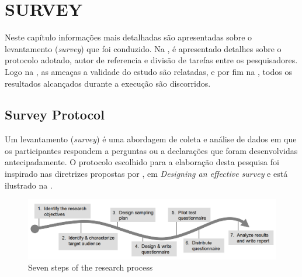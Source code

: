 \chapter{SURVEY}\label{sec:5}

Neste capítulo informações mais detalhadas são apresentadas sobre o levantamento (\textit{survey}) que foi conduzido. 
Na , é apresentado detalhes sobre o protocolo adotado, autor de referencia e divisão de tarefas entre os pesquisadores. 
Logo na , as ameaças a validade do estudo são relatadas, e por fim na , todos os resultados alcançados durante a execução são discorridos.


\section{Survey Protocol} \label{sec:survey-protocol}

Um levantamento (\textit{survey}) é uma abordagem de coleta e análise de dados em que os participantes respondem a perguntas ou a declarações que foram desenvolvidas antecipadamente. 
O protocolo escolhido para a elaboração desta pesquisa foi inspirado nas diretrizes propostas por , em \textit{Designing an effective survey} e está ilustrado na .


\begin{figure}[htb]
  \caption{Seven steps of the research process}\label{fig:setepassos}
  \begin{center}
    \includegraphics[width=16cm]{img/kasunic_process.png}
  \end{center}
\end{figure}

